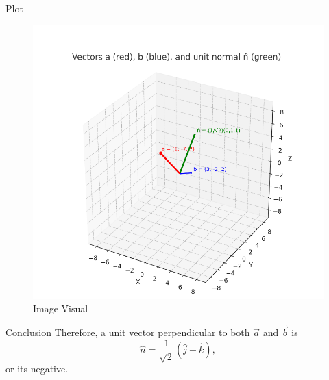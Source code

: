 \documentclass{beamer}
\begin{document}
\begin{frame}{Plot}
    \begin{figure}[H]
    \centering
    \includegraphics[width=0.75\columnwidth]{figs/image.png}
    \caption{Image Visual}
    \label{fig:figs/image.png}
    \end{figure}
\end{frame}

\begin{frame}{Conclusion}
    Therefore, a unit vector perpendicular to both $\vec{a}$ and $\vec{b}$ is
\[
\hat{n} = \frac{1}{\sqrt{2}}(\hat{j} + \hat{k}),
\]
or its negative.
\end{frame}
\end{document}

